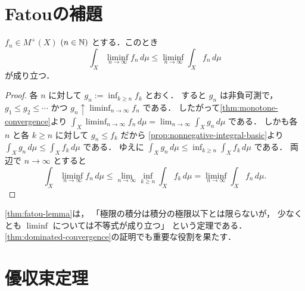 \section{Fatouの補題}

\begin{theorem}[Fatouの補題]\label{thm:fatou-lemma}
$f_n\in M^+(X)$ $(n\in\mathbb N)$ とする．このとき
\[
\int_X \liminf_{n\to\infty} f_n\,d\mu
\le
\liminf_{n\to\infty}\int_X f_n\,d\mu
\]
が成り立つ．
\end{theorem}
\begin{proof}
各 $n$ に対して $g_n:=\inf_{k\ge n}f_k$ とおく．
すると $g_n$ は非負可測で，$g_1\le g_2\le \cdots$ かつ
$g_n \uparrow \liminf_{n\to\infty} f_n$ である．
したがって\cref{thm:monotone-convergence}より
$\int_X \liminf_{n\to\infty} f_n\,d\mu=\lim_{n\to\infty}\int_X g_n\,d\mu$ である．
しかも各 $n$ と各 $k\ge n$ に対して $g_n\le f_k$ だから
\cref{prop:nonnegative-integral-basic}より $\int_X g_n\,d\mu\le \int_X f_k\,d\mu$ である．
ゆえに $\int_X g_n\,d\mu\le \inf_{k\ge n}\int_X f_k\,d\mu$ である．
両辺で $n\to\infty$ とすると
\[
\int_X \liminf_{n\to\infty} f_n\,d\mu
\le \lim_{n\to\infty}\inf_{k\ge n}\int_X f_k\,d\mu
=\liminf_{n\to\infty}\int_X f_n\,d\mu.
\]
\end{proof}

\begin{remark}
\cref{thm:fatou-lemma}は，
「極限の積分は積分の極限以下とは限らないが，
少なくとも \(\liminf\) については不等式が成り立つ」
という定理である．
\cref{thm:dominated-convergence}の証明でも重要な役割を果たす．
\end{remark}

\section{優収束定理}


